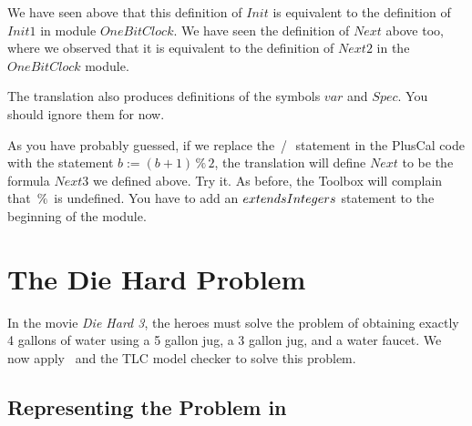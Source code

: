 \documentclass[fleqn,leqno]{article}
\begin{document}
We have seen above that this definition of $Init$ is equivalent to the
definition of $Init1$ in module $OneBitClock$.  We have seen the
definition of $Next$ above too, where we observed that it is
equivalent to the definition of $Next2$ in the $OneBitClock$ module.

The translation also produces definitions of the symbols $var$ and $Spec$.
You should ignore them for now.

\bigskip

As you have probably guessed, if we replace the \pif\,/\,\pelse\
statement in the PlusCal code with the statement $b := (b+1)\,\%\,2$, the
translation will define $Next$ to be the formula $Next3$ we defined
above.  Try it.  As before, the Toolbox will complain that \,$\%$\, is
undefined.  You have to add an $\EXTENDS Integers$ statement to the
beginning of the module.

\newpage
\vspace{-\baselineskip}%
\section{The Die Hard Problem} 

In the movie \emph{Die Hard 3}, the heroes must solve the problem of
obtaining exactly 4 gallons of water using a 5 gallon jug, a 3 gallon
jug, and a water faucet.  We now apply \tlaplus\ and the TLC
model checker to solve this problem.

\subsection{Representing the Problem in \protect\tlaplus}
\end{document}
